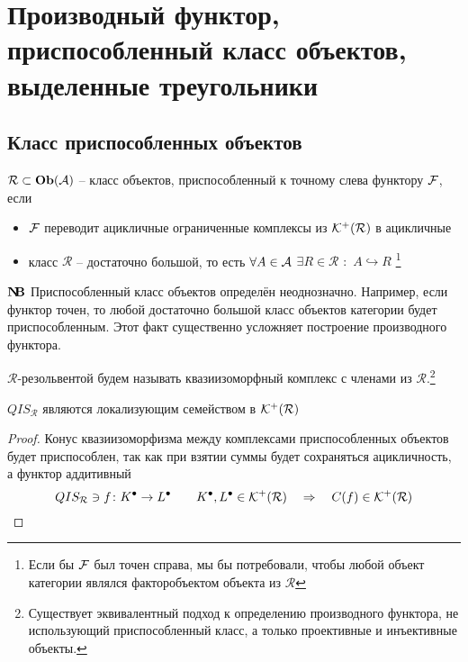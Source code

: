\documentclass[../main.tex]{subfiles}
\begin{document}
\section{Производный функтор, приспособленный класс объектов, выделенные треугольники }
\subsection{Класс приспособленных объектов}
\begin{to_def}
    $\mathcal{R} \subset \mathbf{Ob}(\mathcal{A})$ -- класс объектов, приспособленный к точному слева функтору $\mathcal{F}$, если 
    \begin{itemize}
        \item $\mathcal{F}$ переводит ацикличные ограниченные комплексы из $\mathcal{K^+(R)}$ в ацикличные
        \item класс $\mathcal{R}$ -- достаточно большой, то есть $\forall A \in \mathcal{A}$ $\exists R \in \mathcal{R}$ $\colon$ $A \hookrightarrow R$ \footnote{Если бы $\mathcal{F}$ был точен справа, мы бы потребовали, чтобы любой объект категории являлся факторобъектом объекта из $\mathcal{R}$}
    \end{itemize}
\end{to_def}
$\mathbf{N\kern-0.3em B}$ Приспособленный класс объектов определён неоднозначно. Например, если функтор точен, то любой достаточно большой класс объектов категории будет приспособленным. Этот факт существенно усложняет построение производного функтора.
\begin{to_def}
$\mathcal{R}$-резольвентой будем называть квазиизоморфный комплекс с членами из $\mathcal{R}$.\footnote{Существует эквивалентный подход к определению производного функтора, не использующий приспособленный класс, а только проективные и инъективные объекты.}
\end{to_def}
\begin{to_claim}
 $QIS_{\mathcal{R}}$ являются локализующим семейством в $\mathcal{K^+(R)}$
\end{to_claim}
\begin{proof}
Конус квазиизоморфизма между комплексами приспособленных объектов будет приспособлен, так как при взятии суммы будет сохраняться ацикличность, а функтор аддитивный 
    \[QIS_{\mathcal{R}} \ni f\colon K^\bullet \to L^\bullet \qquad K^\bullet, L^\bullet \in \mathcal{K^+(R)} \quad \Rightarrow \quad C(f) \in \mathcal{K^+(R)}\]
\end{proof}
\end{document}
